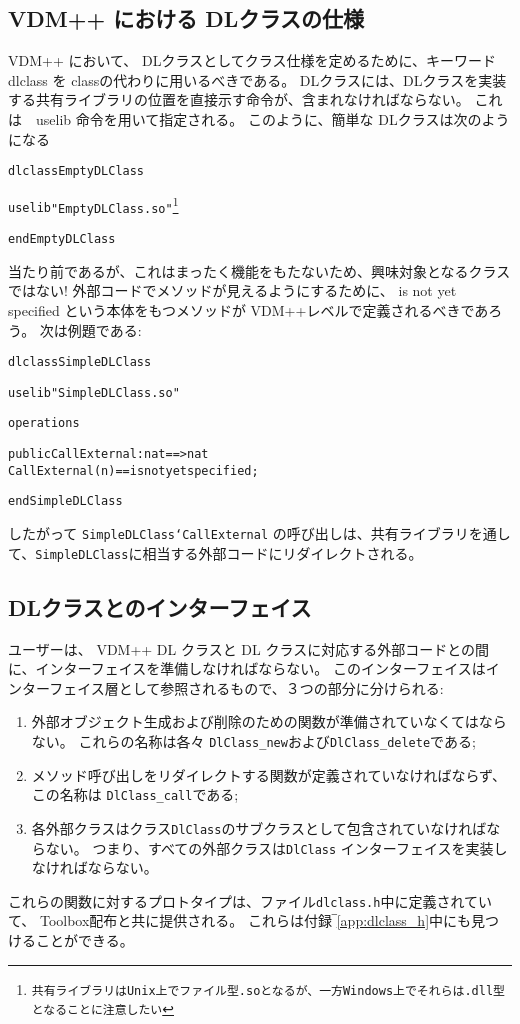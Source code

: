 \documentclass[\pformat,12pt]{jarticle}
\begin{document}
\subsection{VDM++ における DLクラスの仕様}

VDM++ において、 DLクラスとしてクラス仕様を定めるために、キーワード\textsf{dlclass} を \textsf{class}の代わりに用いるべきである。
DLクラスには、DLクラスを実装する共有ライブラリの位置を直接示す命令が、含まれなければならない。 
これは　\textsf{uselib} 命令を用いて指定される。 
このように、簡単な DLクラスは次のようになる

\begin{alltt}
\textsf{dlclass} EmptyDLClass

\textsf{uselib} "EmptyDLClass.so"\footnote{共有ライブラリは Unix 上でファイル型\texttt{.so}となるが、一方 Windows 上でそれらは \texttt{.dll}型となることに注意したい} 

\textsf{end} EmptyDLClass
\end{alltt}

当たり前であるが、これはまったく機能をもたないため、興味対象となるクラスではない! 
外部コードでメソッドが見えるようにするために、 \textsf{is not yet specified} という本体をもつメソッドが VDM++レベルで定義されるべきであろう。
次は例題である:

\begin{alltt}
\textsf{dlclass} SimpleDLClass

\textsf{uselib} "SimpleDLClass.so"

\textsf{operations}

\textsf{public} CallExternal : nat ==> nat
CallExternal (n) == \textsf{is not yet specified};

\textsf{end} SimpleDLClass
\end{alltt}
したがって \texttt{SimpleDLClass`CallExternal} の呼び出しは、共有ライブラリを通して、\texttt{SimpleDLClass}に相当する外部コードにリダイレクトされる。

\subsection{DLクラスとのインターフェイス}

ユーザーは、 VDM++ DL クラスと DL クラスに対応する外部コードとの間に、インターフェイスを準備しなければならない。
このインターフェイスはインターフェイス層として参照されるもので、３つの部分に分けられる:
\begin{enumerate}
\item 外部オブジェクト生成および削除のための関数が準備されていなくてはならない。
これらの名称は各々 \texttt{DlClass\_new}および\texttt{DlClass\_delete}である; 
\item メソッド呼び出しをリダイレクトする関数が定義されていなければならず、この名称は \texttt{DlClass\_call}である;
\item 各外部クラスはクラス\texttt{DlClass}のサブクラスとして包含されていなければならない。 
つまり、すべての外部クラスは\texttt{DlClass} インターフェイスを実装しなければならない。
\end{enumerate}
これらの関数に対するプロトタイプは、ファイル\texttt{dlclass.h}中に定義されていて、 Toolbox配布と共に提供される。
これらは付録‾\ref{app:dlclass_h}中にも見つけることができる。 
\end{document}
